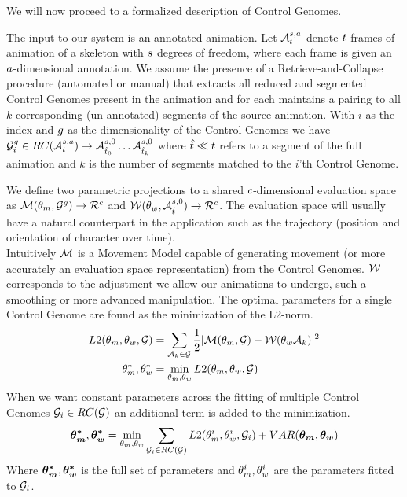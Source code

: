 We will now proceed to a formalized description of Control Genomes.

The input to our system is an annotated animation. Let $\mathcal{A}^{s,a}_t$ denote $t$ frames of animation of a skeleton with $s$ degrees of freedom, where each frame is given an $a$-dimensional annotation. We assume the presence of a Retrieve-and-Collapse procedure (automated or manual) that extracts all reduced and segmented Control Genomes present in the animation and for each maintains a pairing to all $k$ corresponding (un-annotated) segments of the source animation. With $i$ as the index and $g$ as the dimensionality of the Control Genomes we have $\mathcal{G}^g_i\in{RC}(\mathcal{A}^{s,a}_t)\rightarrow\mathcal{A}^{s,0}_{{\hat{t}}_0}\ldots\mathcal{A}^{s,0}_{{\hat{t}}_k}$ where ${\hat{t}}\ll t$ refers to a segment of the full animation and $k$ is the number of segments matched to the $i$'th Control Genome.


We define two parametric projections to a shared $c$-dimensional evaluation space as $\mathcal{M}(\theta_{m},\mathcal{G}^{g}) \rightarrow \mathcal{R}^{c}$ and $\mathcal{W}(\theta_{w},\mathcal{A}_{{\hat{t}}}^{s,0}) \rightarrow \mathcal{R}^{c}$. The evaluation space will usually have a natural counterpart in the application such as the trajectory (position and orientation of character over time).\\
Intuitively $\mathcal{M}$ is a Movement Model capable of generating movement (or more accurately an evaluation space representation) from the Control Genomes. $\mathcal{W}$ corresponds to the adjustment we allow our animations to undergo, such a smoothing or more advanced manipulation. The optimal parameters for a single Control Genome are found as the minimization of the L2-norm.
\begin{subequations}
\begin{align}
    {L2}(\theta_{m},\theta_{w},\mathcal{G})&=\sum_{\mathcal{A}_k\in\mathcal{G}}{\frac{1}{2}|\mathcal{M}(\theta_{m},\mathcal{G})-\mathcal{W}(\theta_{w}\mathcal{A}_k)|^2}\\
    \theta_{m}^*,\theta_{w}^*&=\min_{\theta_{m},\theta_{w}}{{L2}(\theta_{m},\theta_{w},\mathcal{G})}
\end{align}
\end{subequations}
When we want constant parameters across the fitting of multiple Control Genomes $\mathcal{G}_i\in{RC}(\mathcal{G})$ an additional term is added to the minimization. 
\begin{equation}
    \boldsymbol{\theta_{m}^* },\boldsymbol{\theta_{w}^* }=\min_{\theta_{m},\theta_{w}}{\sum_{\mathcal{G}_i\in{RC}(\mathcal{G})}{{L2}(\theta_{m}^i,\theta_{w}^i,\mathcal{G}_i)}}+VAR(\boldsymbol{\theta_{m} },\boldsymbol{\theta_{w} })
\end{equation}
Where $\boldsymbol{\theta_{m}^* },\boldsymbol{\theta_{w}^* }$ is the full set of parameters and $\theta_{m}^i,\theta_{w}^i$ are the parameters fitted to $\mathcal{G}_i$.

